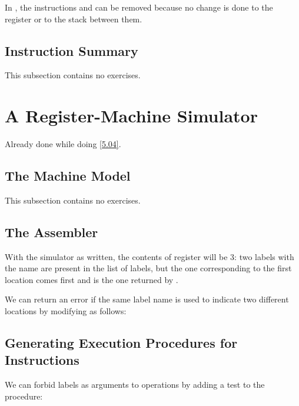 \begin{exe}[5.6]
    In , the instructions  and 
     can be removed because no change is done to the 
     register or to the stack between them.
\end{exe}

\subsection{Instruction Summary}

This subsection contains no exercises.

\section{A Register-Machine Simulator}

\begin{exe}[5.7]
    Already done while doing \autoref{5.04}.
\end{exe}

\subsection{The Machine Model}

This subsection contains no exercises.

\subsection{The Assembler}

\begin{exe}[5.8]
    With the simulator as written, the contents of register  will be 3: 
    two labels with the name  are present in the list of labels, but 
    the one corresponding to the first location comes first and is the one 
    returned by .

    We can return an error if the same label name is used to indicate two 
    different locations by modifying  as follows:
\end{exe}

\subsection{Generating Execution Procedures for Instructions}

\begin{exe}[5.9]
    We can forbid labels as arguments to operations by adding a test to the 
     procedure:
\end{exe}

